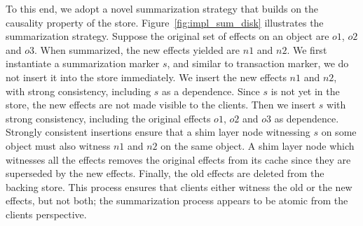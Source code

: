 To this end, we adopt a novel summarization strategy that builds on the
causality property of the store. Figure~\ref{fig:impl_sum_disk} illustrates the
summarization strategy. Suppose the original set of effects on an object are
$o1$, $o2$ and $o3$. When summarized, the new effects yielded are $n1$ and
$n2$. We first instantiate a summarization marker $s$, and similar to
transaction marker, we do not insert it into the store immediately. We insert
the new effects $n1$ and $n2$, with strong consistency, including $s$ as a
dependence. Since $s$ is not yet in the store, the new effects are not made
visible to the clients. Then we insert $s$ with strong consistency, including
the original effects $o1$, $o2$ and $o3$ as dependence. Strongly consistent
insertions ensure that a shim layer node witnessing $s$ on some object must
also witness $n1$ and $n2$ on the same object. A shim layer node which
witnesses all the effects removes the original effects from its cache since
they are superseded by the new effects. Finally, the old effects are deleted
from the backing store. This process ensures that clients either witness the
old or the new effects, but not both; the summarization process appears to be
atomic from the clients perspective.
